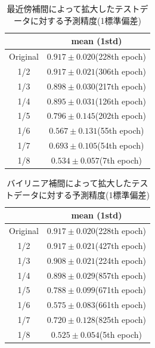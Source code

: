 \documentclass[a4j, 11pt]{jreport}
\begin{document}
\begin{table}[H]
  \centering
	\caption{最近傍補間によって拡大したテストデータに対する予測精度(1標準偏差)}
  \begin{tabular}{|c|c|}
		\hline
    & mean (1std) \\ \hline
    Original & $0.917 \pm 0.020$(228th epoch) \\ \hline
    1/2 & $0.917 \pm 0.021$(306th epoch) \\ \hline
    1/3 & $0.898 \pm 0.030$(217th epoch) \\ \hline
    1/4 & $0.895 \pm 0.031$(126th epoch) \\ \hline
    1/5 & $0.796 \pm 0.145$(202th epoch) \\ \hline
    1/6 & $0.567 \pm 0.131$(55th epoch) \\ \hline
    1/7 & $0.693 \pm 0.105$(54th epoch) \\ \hline
    1/8 & $0.534 \pm 0.057$(7th epoch) \\ \hline
  \end{tabular}
  \label{tb:accs_4_2_nearest_1std}
\end{table}

\begin{table}[H]
  \centering
	\caption{バイリニア補間によって拡大したテストデータに対する予測精度(1標準偏差)}
  \begin{tabular}{|c|c|}
		\hline
    & mean (1std) \\ \hline
    Original & $0.917 \pm 0.020$(228th epoch) \\ \hline
    1/2 & $0.917 \pm 0.021$(427th epoch) \\ \hline
    1/3 & $0.908 \pm 0.021$(224th epoch) \\ \hline
    1/4 & $0.898 \pm 0.029$(857th epoch) \\ \hline
    1/5 & $0.788 \pm 0.099$(671th epoch) \\ \hline
    1/6 & $0.575 \pm 0.083$(661th epoch) \\ \hline
    1/7 & $0.720 \pm 0.128$(825th epoch) \\ \hline
    1/8 & $0.525 \pm 0.054$(5th epoch) \\ \hline
  \end{tabular}
  \label{tb:accs_4_2_linear_1std}
\end{table}
\end{document}
